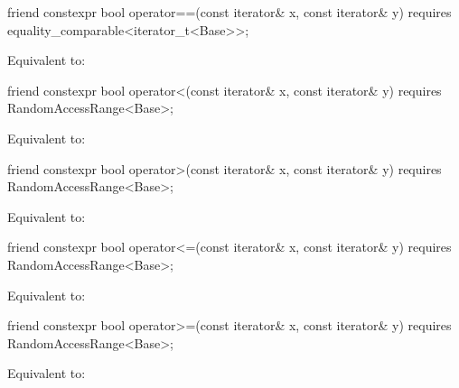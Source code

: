 \begin{itemdecl}
friend constexpr bool operator==(const iterator& x, const iterator& y)
  requires equality_comparable<iterator_t<Base>>;
\end{itemdecl}

\begin{itemdescr}
\pnum
\effects Equivalent to: 
\end{itemdescr}

%
\begin{itemdecl}
friend constexpr bool operator<(const iterator& x, const iterator& y)
  requires RandomAccessRange<Base>;
\end{itemdecl}

\begin{itemdescr}
\pnum
\effects Equivalent to: 
\end{itemdescr}

%
\begin{itemdecl}
friend constexpr bool operator>(const iterator& x, const iterator& y)
  requires RandomAccessRange<Base>;
\end{itemdecl}

\begin{itemdescr}
\pnum
\effects Equivalent to: 
\end{itemdescr}

%
\begin{itemdecl}
friend constexpr bool operator<=(const iterator& x, const iterator& y)
  requires RandomAccessRange<Base>;
\end{itemdecl}

\begin{itemdescr}
\pnum
\effects Equivalent to: 
\end{itemdescr}

%
\begin{itemdecl}
friend constexpr bool operator>=(const iterator& x, const iterator& y)
  requires RandomAccessRange<Base>;
\end{itemdecl}

\begin{itemdescr}
\pnum
\effects Equivalent to: 
\end{itemdescr}

